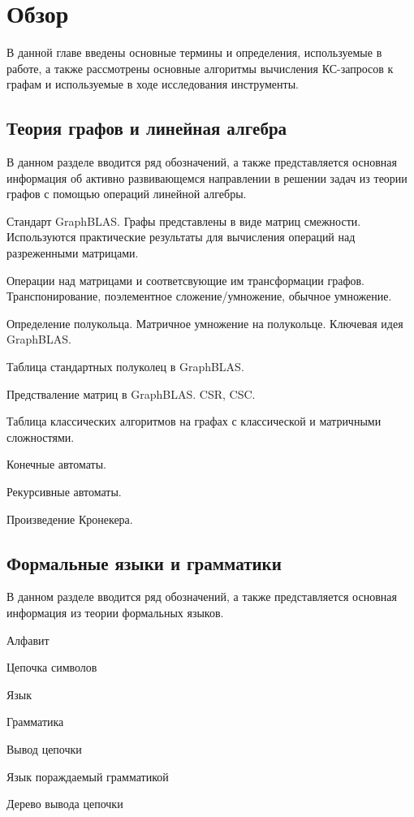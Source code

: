 \chapter{Обзор}\label{ch:ch1}
В данной главе введены основные термины и определения, используемые в работе, а также рассмотрены основные алгоритмы вычисления КС-запросов к графам и используемые в ходе исследования инструменты. 

\section{Теория графов и линейная алгебра}\label{sec:ch1/sec1}
В данном разделе вводится ряд обозначений, а также представляется основная информация об активно развивающемся направлении в решении задач из теории графов с помощью операций линейной алгебры.

Стандарт GraphBLAS. Графы представлены в виде матриц смежности. Используются практические результаты для вычисления операций над разреженными матрицами.

Операции над матрицами и соответсвующие им трансформации графов. Транспонирование, поэлементное сложение/умножение, обычное умножение.

Определение полукольца. Матричное умножение на полукольце. Ключевая идея GraphBLAS.

Таблица стандартных полуколец в GraphBLAS.

Предстваление матриц в GraphBLAS. CSR, CSC.

Таблица классических алгоритмов на графах с классической и матричными сложностями.

Конечные автоматы.

Рекурсивные автоматы.

Произведение Кронекера.


\section{Формальные языки и грамматики}\label{sec:ch1/sec2}
В данном разделе вводится ряд обозначений, а также представляется основная информация из теории формальных языков.

Алфавит

Цепочка символов

Язык

Грамматика

Вывод цепочки

Язык пораждаемый грамматикой

Дерево вывода цепочки

